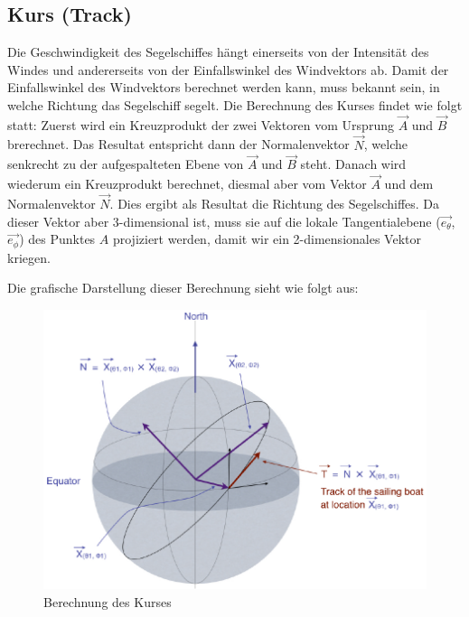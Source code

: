 \subsection{Kurs (Track)}
Die Geschwindigkeit des Segelschiffes hängt einerseits von der Intensität des
Windes und andererseits von der Einfallswinkel des Windvektors ab. Damit der
Einfallswinkel des Windvektors berechnet werden kann, muss bekannt sein, in
welche Richtung das Segelschiff segelt. Die Berechnung des Kurses findet wie
folgt statt: Zuerst wird ein Kreuzprodukt der zwei Vektoren vom Ursprung
\(\overrightarrow{A}\) und \(\overrightarrow{B}\) brerechnet. Das Resultat
entspricht dann der Normalenvektor \(\overrightarrow{N}\), welche senkrecht zu
der aufgespalteten Ebene von \(\overrightarrow{A}\) und \(\overrightarrow{B}\)
steht. Danach wird wiederum ein Kreuzprodukt berechnet, diesmal aber vom
Vektor \(\overrightarrow{A}\) und dem Normalenvektor \(\overrightarrow{N}\).
Dies ergibt als Resultat die Richtung des Segelschiffes. Da dieser Vektor aber
3-dimensional ist, muss sie auf die lokale Tangentialebene
(\(\overrightarrow{e_{\theta}}\), \(\overrightarrow{e_{\phi}}\)) des Punktes
$A$ projiziert werden, damit wir ein 2-dimensionales Vektor kriegen.

Die grafische Darstellung dieser Berechnung sieht wie folgt aus:
\begin{figure}[h!]
\centering
\includegraphics[width=0.8\linewidth]{img/track}
\caption{Berechnung des Kurses}
\label{gridnetConn}
\end{figure}

